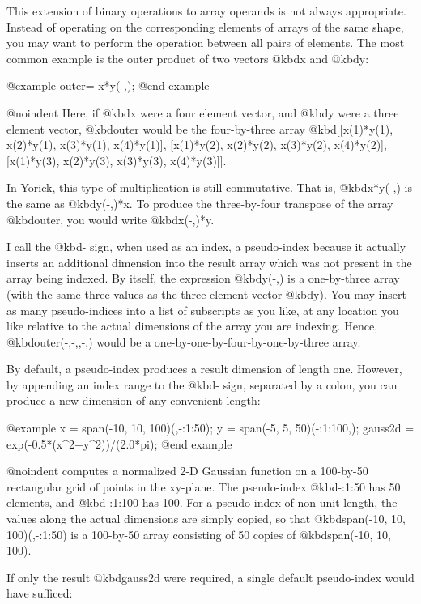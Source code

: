This extension of binary operations to array operands is not always
appropriate.  Instead of operating on the corresponding elements of
arrays of the same shape, you may want to perform the operation between
all pairs of elements.  The most common example is the outer product
of two vectors @kbd{x} and @kbd{y}:

@example
outer= x*y(-,);
@end example

@noindent
Here, if @kbd{x} were a four element vector, and @kbd{y} were a three
element vector, @kbd{outer} would be the four-by-three array
@kbd{[[x(1)*y(1), x(2)*y(1), x(3)*y(1), x(4)*y(1)], [x(1)*y(2),
x(2)*y(2), x(3)*y(2), x(4)*y(2)], [x(1)*y(3), x(2)*y(3), x(3)*y(3),
x(4)*y(3)]]}.

In Yorick, this type of multiplication is still commutative.  That is,
@kbd{x*y(-,)} is the same as @kbd{y(-,)*x}.  To produce the three-by-four
transpose of the array @kbd{outer}, you would write @kbd{x(-,)*y}.

I call the @kbd{-} sign, when used as an index, a pseudo-index because
it actually inserts an additional dimension into the result array which
was not present in the array being indexed.  By itself, the expression
@kbd{y(-,)} is a one-by-three array (with the same three values as the
three element vector @kbd{y}).  You may insert as many pseudo-indices
into a list of subscripts as you like, at any location you like relative
to the actual dimensions of the array you are indexing.  Hence,
@kbd{outer(-,-,,-,)} would be a one-by-one-by-four-by-one-by-three array.


By default, a pseudo-index produces a result dimension of length one.
However, by appending an index range to the @kbd{-} sign, separated by
a colon, you can produce a new dimension of any convenient length:

@example
x = span(-10, 10, 100)(,-:1:50);
y = span(-5, 5, 50)(-:1:100,);
gauss2d = exp(-0.5*(x^2+y^2))/(2.0*pi);
@end example

@noindent
computes a normalized 2-D Gaussian function on a 100-by-50 rectangular
grid of points in the xy-plane.  The pseudo-index @kbd{-:1:50} has 50
elements, and @kbd{-:1:100} has 100.  For a pseudo-index of non-unit
length, the values along the actual dimensions are simply copied, so
that @kbd{span(-10, 10, 100)(,-:1:50)} is a 100-by-50 array consisting
of 50 copies of @kbd{span(-10, 10, 100)}.

If only the result @kbd{gauss2d} were required, a single default
pseudo-index would have sufficed:

